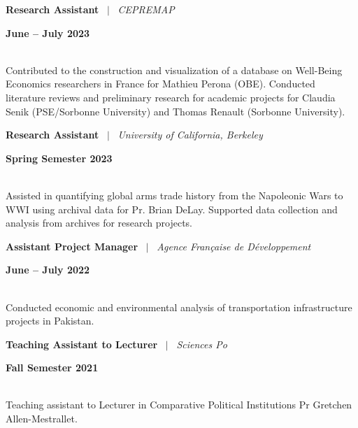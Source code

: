 \documentclass[a4paper,11pt]{article}
\begin{document}
\noindent
\begin{minipage}[t]{0.7\textwidth}
  \textbf{Research Assistant} \ $|$ \ \textit{CEPREMAP}
\end{minipage}%
\begin{minipage}[t]{0.3\textwidth}
  \raggedleft \textbf{June -- July 2023}
\end{minipage}
\\
Contributed to the construction and visualization of a database on Well-Being Economics researchers in France for Mathieu Perona (OBE). Conducted literature reviews and preliminary research for academic projects for Claudia Senik (PSE/Sorbonne University) and Thomas Renault (Sorbonne University).

\noindent
\begin{minipage}[t]{0.7\textwidth}
  \textbf{Research Assistant} \ $|$ \ \textit{University of California, Berkeley}
\end{minipage}%
\begin{minipage}[t]{0.3\textwidth}
  \raggedleft \textbf{Spring Semester 2023}
\end{minipage}
\\
Assisted in quantifying global arms trade history from the Napoleonic Wars to WWI using archival data for Pr. Brian DeLay. Supported data collection and analysis from archives for research projects.

\noindent
\begin{minipage}[t]{0.7\textwidth}
  \textbf{Assistant Project Manager} \ $|$ \ \textit{Agence Française de Développement}
\end{minipage}%
\begin{minipage}[t]{0.3\textwidth}
  \raggedleft \textbf{June -- July 2022}
\end{minipage}
\\
Conducted economic and environmental analysis of transportation infrastructure projects in Pakistan.

\noindent
\begin{minipage}[t]{0.7\textwidth}
  \textbf{Teaching Assistant to Lecturer} \ $|$ \ \textit{Sciences Po}
\end{minipage}
\begin{minipage}[t]{0.3\textwidth}
  \raggedleft \textbf{Fall Semester 2021}
\end{minipage}
\\
Teaching assistant to Lecturer in Comparative Political Institutions Pr Gretchen Allen-Mestrallet.
\end{document}
